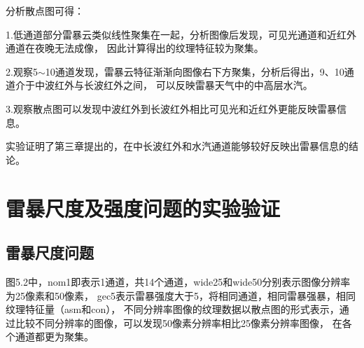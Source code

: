 分析散点图可得：

1.低通道部分雷暴云类似线性聚集在一起，分析图像后发现，可见光通道和近红外通道在夜晚无法成像，
因此计算得出的纹理特征较为聚集。

2.观察5$\sim$10通道发现，雷暴云特征渐渐向图像右下方聚集，分析后得出，9、10通道介于中波红外与长波红外之间，
可以反映雷暴天气中的中高层水汽。

3.观察散点图可以发现中波红外到长波红外相比可见光和近红外更能反映雷暴信息。

实验证明了第三章提出的，在中长波红外和水汽通道能够较好反映出雷暴信息的结论。

\section{雷暴尺度及强度问题的实验验证}
\subsection{雷暴尺度问题}
图5.2中，nom1即表示1通道，共14个通道，wide25和wide50分别表示图像分辨率为25像素和50像素，
gec5表示雷暴强度大于5，将相同通道，相同雷暴强暴，相同纹理特征量（asm和con），
不同分辨率图像的纹理数据以散点图的形式表示，通过比较不同分辨率的图像，可以发现50像素分辨率相比25像素分辨率图像，
在各个通道都更为聚集。

